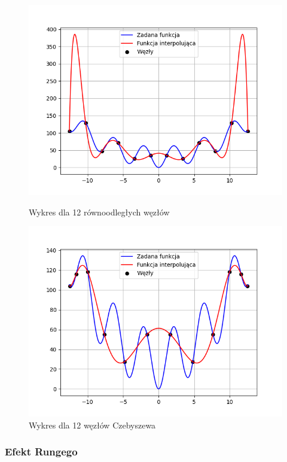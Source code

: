 \documentclass{article}
\begin{document}
\begin{figure}[H]
  \begin{minipage}[b]{0.49\textwidth}
    \includegraphics[width=\textwidth]{img08.png}
    \caption{Wykres dla 12 równoodległych węzłów}
  \end{minipage}
  \hfill
  \begin{minipage}[b]{0.49\textwidth}
    \includegraphics[width=\textwidth]{img09.png}
    \caption{Wykres dla 12 węzłów Czebyszewa}
  \end{minipage}
\end{figure}

\subsubsection{Efekt Rungego}
\end{document}

